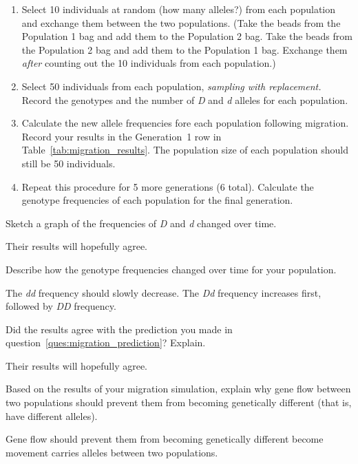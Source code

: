\documentclass[12pt]{exam}
\newcommand*\AnswerBox[2]{%
    \parbox[t][#1]{0.92\textwidth}{%
    \begin{solution}#2\end{solution}}
    \vspace{\stretch{1}}
}
\newcommand{\allele}[1]{\textit{#1}}
\begin{document}
\begin{questions}
\begin{enumerate}
	\item Select 10 individuals at random (how many alleles?) from each population and exchange them between the two populations. (Take the beads from the Population 1 bag and add them to the Population 2 bag. Take the beads from the Population 2 bag and add them to the Population 1 bag. Exchange them \emph{after} counting out the 10 individuals from each population.)
	
	\item Select 50 individuals from each population, \emph{sampling with replacement.} Record the genotypes and the number of \allele{D} and \allele{d} alleles for each population.
	
	\item Calculate the new allele frequencies fore each population following migration. Record your results in the Generation~1 row in Table~\ref{tab:migration_results}. The population size of each population should still be 50 individuals.
	
	\item Repeat this procedure for 5 more generations (6 total). Calculate the genotype frequencies of each population for the final generation.

\end{enumerate}

\question
Sketch a graph of the frequencies of \allele{D} and \allele{d} changed over time.

\AnswerBox{4\baselineskip}{Their results will hopefully agree.}

\question
Describe how the genotype frequencies changed over time for your population.

\AnswerBox{3\baselineskip}{The \allele{dd} frequency should slowly decrease. The \allele{Dd} frequency increases first, followed by \allele{DD} frequency.}

\question
Did the results agree with the prediction you made in question~\ref{ques:migration_prediction}? Explain.

\AnswerBox{3\baselineskip}{Their results will hopefully agree.}

\question[Checkout]
Based on the results of your migration simulation, explain why gene flow between two populations should prevent them from becoming genetically different (that is, have different alleles).

\AnswerBox{3\baselineskip}{Gene flow should prevent them from becoming genetically different become movement carries alleles between two populations.}


\end{questions}
\end{document}
